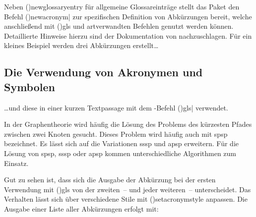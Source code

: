 \documentclass[%
  english,ngerman,%
  cdgeometry=no,DIV=12,%
  cd=false,cdfont=false,cdtitle=true,%
  headings=normal,%
  automark,%
  listof=toc,%
]{tudscrartcl}
\begin{document}
Neben \Macro(){newglossaryentry} für allgemeine 
Glossareinträge stellt das Paket  den Befehl 
\Macro(){newacronym|%
  \OList{}} 
zur spezifischen Definition von Abkürzungen bereit, welche anschließend mit 
\Macro(){gls} und artverwandten Befehlen 
genutzt werden können. Detaillierte Hinweise hierzu sind der Dokumentation von 
 nachzuschlagen. Für ein kleines Beispiel werden drei 
Abkürzungen erstellt\dots
%
\begin{Trunk+}
\section{Die Verwendung von Akronymen und Symbolen}

\end{Trunk+}
\CodeHook{\renewcommand*\newglossaryentry[2]{}}
\begin{Trunk*}

\end{Trunk*}
%
\dots und diese in einer kurzen Textpassage mit dem -Befehl
\Macro(){gls|} verwendet.
%
\begin{Trunk*}
In der Graphentheorie wird häufig die Lösung des Problems des kürzesten
Pfades zwischen zwei Knoten gesucht. Dieses Problem wird häufig auch
mit \gls{spsp} bezeichnet. Es lässt sich auf die Variationen \gls{sssp}
und \gls{apsp} erweitern. Für die Lösung von \gls{spsp}, \gls{sssp} 
oder \gls{apsp} kommen unterschiedliche Algorithmen zum Einsatz.

\end{Trunk*}
%
Gut zu sehen ist, dass sich die Ausgabe der Abkürzung bei der ersten Verwendung 
mit \Macro(){gls} von der zweiten~-- und jeder weiteren~-- 
unterscheidet. Das Verhalten lässt sich über verschiedene Stile mit 
\Macro(){setacronymstyle} anpassen. Die Ausgabe einer Liste 
aller Abkürzungen erfolgt mit:
%
\begin{Hint}
\printacronyms
\end{Hint}
\end{document}
